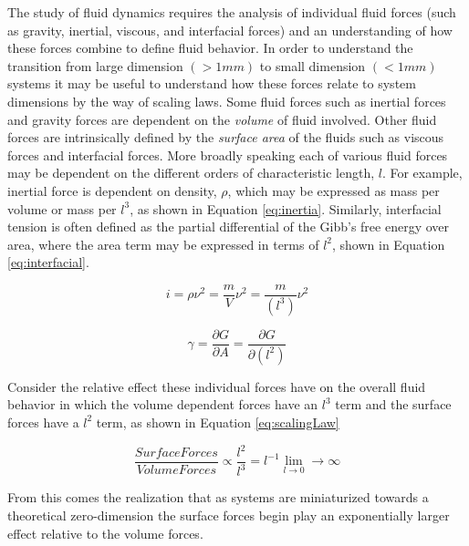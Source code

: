 \cite{Yang2010,Shui2007a,Zhao2011}


The study of fluid dynamics requires the analysis of individual fluid forces (such as gravity, inertial, viscous, and interfacial forces) and an understanding of how these forces combine to define fluid behavior. In order to understand the transition from large dimension $(>1mm)$ to small dimension $(<1mm)$ systems it may be useful to understand how these forces relate to system dimensions by the way of scaling laws. Some fluid forces such as inertial forces and gravity forces are dependent on the \emph{volume} of fluid involved. Other fluid forces are intrinsically defined by the \emph{surface area} of the fluids such as viscous forces and interfacial forces. More broadly speaking each of various fluid forces may be dependent on the different orders of characteristic length, $l$. For example, inertial force is dependent on density, $\rho$, which may be expressed as mass per volume or mass per $l^3$, as shown in Equation \vref{eq:inertia}. Similarly, interfacial tension is often defined as the partial differential of the Gibb's free energy over area, where the area term may be expressed in terms of $l^2$, shown in Equation \vref{eq:interfacial}.


\begin{equation}
i = \rho \nu^2 = \frac{m}{V}\nu^2 = \frac{m}{(l^3)}\nu^2 
\label{eq:inertia}
\end{equation}


\begin{equation}
\gamma = \frac{\partial G}{\partial A} = \frac{\partial G}{\partial (l^2)}
\label{eq:interfacial}
\end{equation}


Consider the relative effect these individual forces have on the overall fluid behavior in which the volume dependent forces have an $l^3$ term and the surface forces have a $l^2$ term, as shown in Equation \vref{eq:scalingLaw} \cite{bruus2008}

\begin{equation}
\frac{Surface Forces}{Volume Forces} \propto \frac{l^2}{l^3} = l^{-1} \lim_{l \to 0}  \rightarrow \infty
\label{eq:scalingLaw}
\end{equation}

From this comes the realization that as systems are miniaturized towards a theoretical zero-dimension the surface forces begin play an exponentially larger effect relative to the volume forces.

